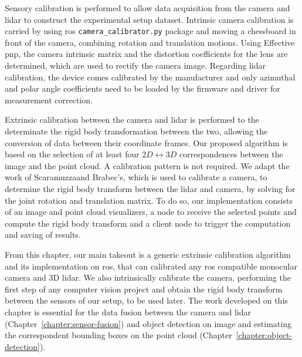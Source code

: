 Sensory calibration is performed to allow data acquisition from the camera and \ac{lidar} to construct the experimental setup dataset. Intrinsic camera calibration is carried by using \ac{ros} \texttt{camera\_calibrator.py} package and moving a chessboard in front of the camera, combining rotation and translation motions. Using Effective \acl{pnp}, the camera intrinsic matrix and the distortion coefficients for the lens are determined, which are used to rectify the camera image. Regarding \ac{lidar} calibration, the device comes calibrated by the manufacturer and only azimuthal and polar angle coefficients need to be loaded by the firmware and driver for measurement correction.

Extrinsic calibration between the camera and \ac{lidar} is performed to the determinate the rigid body transformation between the two, allowing the conversion of data between their coordinate frames. Our proposed algorithm is based on the selection of at least four $2D \leftrightarrow 3D$ correspondences between the image and the point cloud. A calibration pattern is not required. We adapt the work of Scaramuzza\etal and Brabec's, which is used to calibrate a camera, to determine the rigid body transform between the \ac{lidar} and camera, by solving for the joint rotation and translation matrix. To do so, our implementation consists of an image and point cloud visualizers, a node to receive the selected points and compute the rigid body transform and a client node to trigger the computation and saving of results.

From this chapter, our main takeout is a generic extrinsic calibration algorithm and its implementation on \ac{ros}, that can calibrated any \ac{ros} compatible monocular camera and 3D \ac{lidar}. We also intrinsically calibrate the camera, performing the first step of any computer vision project and obtain the rigid body transform between the sensors of our setup, to be used later. The work developed on this chapter is essential for the data fusion between the camera and \ac{lidar} (Chapter~\ref{chapter:sensor-fusion}) and object detection on image and estimating the correspondent bounding boxes on the point cloud (Chapter~\ref{chapter:object-detection}).
